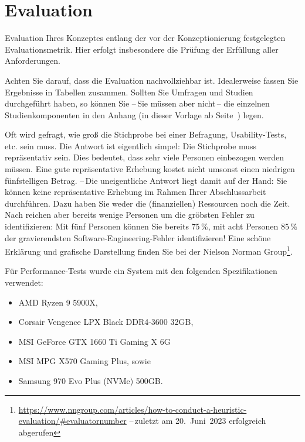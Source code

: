 \chapter{Evaluation}\label{chap:Evaluation}
Evaluation Ihres Konzeptes entlang der vor der Konzeptionierung festgelegten Evaluationsmetrik. Hier erfolgt insbesondere die Prüfung der Erfüllung aller Anforderungen.

Achten Sie darauf, dass die Evaluation nachvollziehbar ist. Idealerweise fassen Sie Ergebnisse in Tabellen zusammen. Sollten Sie Umfragen und Studien durchgeführt haben, so können Sie --\,Sie müssen aber nicht\,-- die einzelnen Studienkomponenten in den Anhang (in dieser Vorlage ab Seite~\pageref{apdx:A}) legen.

Oft wird gefragt, wie groß die Stichprobe bei einer Befragung, Usability-Tests, etc. sein muss. Die Antwort ist eigentlich simpel: Die Stichprobe muss repräsentativ sein. Dies bedeutet, dass sehr viele Personen einbezogen werden müssen. Eine gute repräsentative Erhebung kostet nicht umsonst einen niedrigen fünfstelligen Betrag. --\,Die uneigentliche Antwort liegt damit auf der Hand: Sie können keine repräsentative Erhebung im Rahmen Ihrer Abschlussarbeit durchführen. Dazu haben Sie weder die (finanziellen) Ressourcen noch die Zeit. Nach \cite{nielsen1990,nielsen1994} reichen aber bereits wenige Personen um die gröbsten Fehler zu identifizieren: Mit fünf Personen können Sie bereits $75\,\%$, mit acht Personen $85\,\%$\, der gravierendsten Software-Engineering-Fehler identifizieren! Eine schöne Erklärung und grafische Darstellung finden Sie bei der Nielson Norman Group\footnote{\url{https://www.nngroup.com/articles/how-to-conduct-a-heuristic-evaluation/\#evaluatornumber} --\,zuletzt am 20.~Juni~2023 erfolgreich abgerufen}.


\noindent Für Performance-Tests wurde ein System mit den folgenden Spezifikationen verwendet:
\begin{itemize}
    \item AMD Ryzen 9 5900X,
    \item Corsair Vengence LPX Black DDR4-3600 32GB,
    \item MSI GeForce GTX 1660 Ti Gaming X 6G
    \item MSI MPG X570 Gaming Plus, sowie
    \item Samsung 970 Evo Plus (NVMe) 500GB.
\end{itemize}
